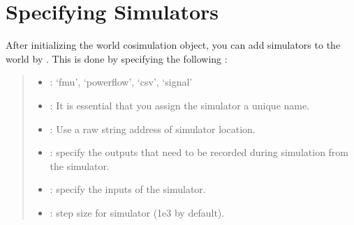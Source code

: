 \documentclass[letterpaper,10pt,english]{sphinxmanual}
\begin{document}
\chapter{Specifying Simulators}
\label{\detokenize{index:specifying-simulators}}
After initializing the world cosimulation object, you can add simulators
to the world by . This is done by specifying
the following :
\begin{quote}
\begin{itemize}
\item {} 
 : ‘fmu’, ‘powerflow’, ‘csv’, ‘signal’

\item {} 
 : It is essential that you assign the simulator a unique name.

\item {} 
 : Use a raw string address of simulator location.

\item {} 
 : specify the outputs that need to be recorded during simulation from the simulator.

\item {} 
 : specify the inputs of the simulator.

\item {} 
 : step size for simulator (1e\sphinxhyphen{}3 by default).

\end{itemize}

\begin{sphinxVerbatim}[commandchars=\\\{\}]
 
 \PYG{p}{[}\PYG{p}{]} \PYG{p}{[}\PYG{p}{]} 
\end{sphinxVerbatim}
\end{quote}
\end{document}

